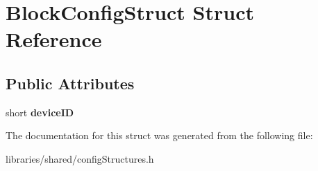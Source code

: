 \hypertarget{struct_block_config_struct}{}\section{Block\+Config\+Struct Struct Reference}
\label{struct_block_config_struct}
\subsection*{Public Attributes}
\begin{DoxyCompactItemize}
\item 
\mbox{\label{struct_block_config_struct_ae89807ba7677e8f1c9b9e0a9f79c9e2d}} 
short {\bfseries device\+ID}
\end{DoxyCompactItemize}


The documentation for this struct was generated from the following file\+:\begin{DoxyCompactItemize}
\item 
libraries/shared/config\+Structures.\+h\end{DoxyCompactItemize}
